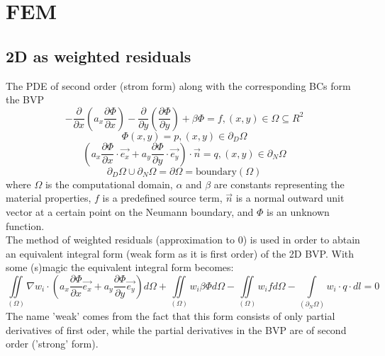 \section{FEM}

\subsection{2D as weighted residuals}
The PDE of second order (strom form) along with the corresponding BCs form the BVP
\begin{equation*}
	-\frac{\partial }{\partial x}\left(a_x \frac{\partial \Phi}{\partial x}\right) - \frac{\partial }{\partial y}\left(\frac{\partial \Phi}{\partial y}\right) + \beta \Phi = f, (x,y) \in \Omega \subseteq R^2
\end{equation*}
\begin{equation*}
	\Phi(x,y) = p, (x,y) \in \partial_D\Omega
\end{equation*}
\begin{equation*}
	\left(a_x \frac{\partial \Phi}{\partial x}\cdot \vec{e_x} + a_y \frac{\partial \Phi}{\partial y} \cdot \vec{e_y}\right) \cdot \vec{n} = q, (x,y) \in \partial_N\Omega
\end{equation*}
\begin{equation*}
	\partial_D\Omega \cup \partial_N\Omega = \partial\Omega = \textrm{boundary}(\Omega)
\end{equation*}
where $\Omega$ is the computational domain, $\alpha$ and $\beta$ are constants representing the material properties, $f$ is a predefined source term, $\vec{n}$ is a normal outward unit vector at a certain point on the Neumann boundary, and $\Phi$ is an unknown function. \\

The method of weighted residuals (approximation to $0$) is used in order to abtain an equivalent integral form (weak form as it is first order) of the 2D BVP. With some (s)magic the equivalent integral form becomes:
\begin{equation*}
	\iint\limits_{\left(\Omega\right)} \nabla w_i \cdot \left(a_x \frac{\partial \Phi}{\partial x} \vec{e_x} + a_y \frac{\partial \Phi}{\partial y} \vec{e_y}\right) d\Omega + \iint\limits_{\left(\Omega\right)} w_i\beta\Phi d\Omega - \iint\limits_{\left(\Omega\right)} w_i f d\Omega  - \int\limits_{\left(\partial_N\Omega\right)} w_i \cdot q \cdot dl = 0
\end{equation*}
The name 'weak' comes from the fact that this form consists of only partial derivatives of first oder, while the partial derivatives in the BVP are of second order ('strong' form).

